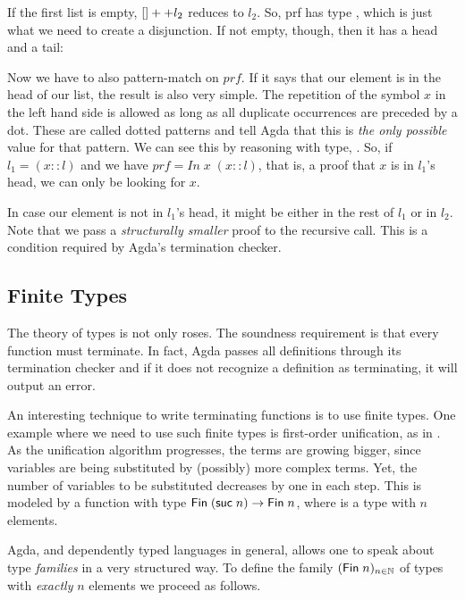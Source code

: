 
If the first list is empty, $[] ++ l_2$ reduces to $l_2$. So, prf has type , which
is just what we need to create a disjunction. If not empty, though, then it has a head and a tail:


 Now we have to also pattern-match
on $prf$. If it says that our element is in the head of our list, the result is also very simple.
The repetition of the symbol $x$ in the left hand side is allowed as long as all duplicate occurrences
are preceded by a dot. These are called dotted patterns and tell Agda that this is \emph{the only possible}
value for that pattern. We can see this by reasoning with  type, . 
So, if $l_1 = (x :: l)$ and we have $prf = In\; x\; (x :: l)$, that is, a proof that $x$ is in $l_1$'s head,
we can only be looking for $x$. 


In case our element is not in $l_1$'s head, it might be either in the rest of $l_1$ or in $l_2$.
Note that we pass a \emph{structurally smaller} proof to the recursive call. This is a condition required by
Agda's termination checker.

\subsection{Finite Types}

The theory of types is not only roses. The soundness requirement is that every function must
terminate. In fact, Agda passes all definitions through its termination checker and if
it does not recognize a definition as terminating, it will output an error.

An interesting technique to write terminating functions is to use finite types. One example
where we need to use such finite types is first-order unification, as in \cite{mcbride03}.
As the unification algorithm progresses, the terms are growing bigger, since variables are being
substituted by (possibly) more complex terms. Yet, the number of variables to be substituted
decreases by one in each step. This is modeled by a function with type $\D{Fin}\;(\IC{suc}\;n) \rightarrow \D{Fin}\;n$,
where   is a type with $n$ elements. 

Agda, and dependently typed languages in general, allows one to speak about type \emph{families}
in a very structured way. To define the family $(\D{Fin}\;n)_{n \in \mathbb{N}}$ of types with 
\emph{exactly} $n$ elements we proceed as follows.

